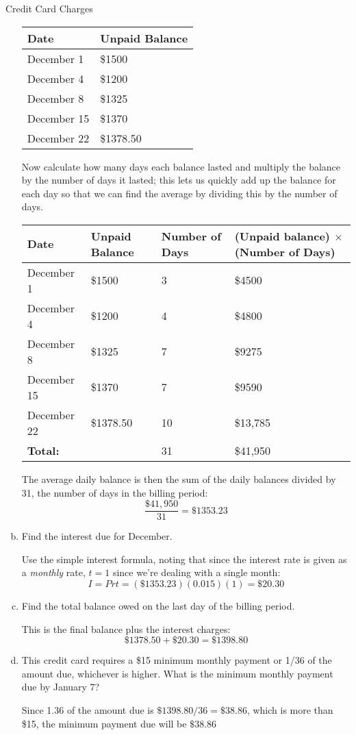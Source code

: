 \begin{example}[https://www.youtube.com/watch?v=ZUEQu_e2TqY&list=PLfmpjsIzhztsZtnb7HnXrQ8SLoiOCIcAM&index=42]{Credit Card Charges}
\begin{enumerate}[(a)]
\begin{center}
\begin{tabular}{l l}
Date & Unpaid Balance\\
\hline
December 1 & \$1500\\
December 4 & \$1200\\
December 8 & \$1325\\
December 15 & \$1370\\
December 22 & \$1378.50\\
\end{tabular}
\end{center}

Now calculate how many days each balance lasted and multiply the balance by the number of days it lasted; this lets us quickly add up the balance for each day so that we can find the average by dividing this by the number of days.
\begin{center}
\begin{tabular}{l l p{0.7in} p{1.5in}}
Date & Unpaid Balance & Number of Days & (Unpaid balance) $\times$ (Number of Days)\\
\hline
December 1 & \$1500 & 3 & \$4500\\
December 4 & \$1200 & 4 & \$4800\\
December 8 & \$1325 & 7 & \$9275\\
December 15 & \$1370 & 7 & \$9590\\
December 22 & \$1378.50 & 10 & \$13,785\\
\hline
\textbf{Total:} & & 31 & \$41,950
\end{tabular}
\end{center}

The average daily balance is then the sum of the daily balances divided by 31, the number of days in the billing period:
\[\dfrac{\$41,950}{31} = \boxed{\$1353.23}\]

\item Find the interest due for December.

Use the simple interest formula, noting that since the interest rate is given as a \textit{monthly} rate, $t=1$ since we're dealing with a single month:
\[I=Prt = (\$1353.23)(0.015)(1) = \boxed{\$20.30}\]

\item Find the total balance owed on the last day of the billing period.

This is the final balance plus the interest charges:
\[\$1378.50 + \$20.30 = \boxed{\$1398.80}\]

\item This credit card requires a \$15 minimum monthly payment or 1/36 of the amount due, whichever is higher.  What is the minimum monthly payment due by January 7?

Since 1.36 of the amount due is $\$1398.80/36 = \$38.86$, which is more than \$15, the minimum payment due will be $\boxed{\$38.86}$
\end{enumerate}
\end{example}


